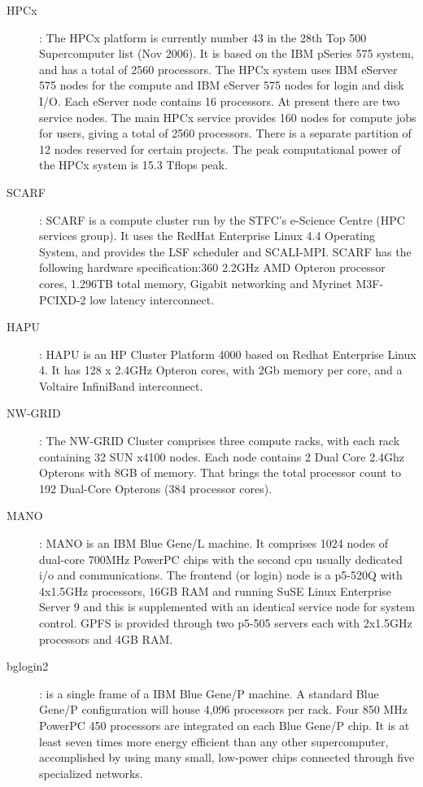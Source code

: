 \begin{description}
\item[HPCx]: The HPCx platform is currently number 43 in the 28th Top 500 Supercomputer list (Nov 2006). It is based on the IBM pSeries 575 system, and has a total of 2560 processors. The HPCx system uses IBM eServer 575 nodes for the compute and IBM eServer 575 nodes for login and disk I/O. Each eServer node contains 16 processors. At present there are two service nodes. The main HPCx service provides 160 nodes for compute jobs for users, giving a total of 2560 processors. There is a separate partition of 12 nodes reserved for certain projects. The peak computational power of the HPCx system is 15.3 Tflops peak.
\item[SCARF]: SCARF is a compute cluster run by the STFC's e-Science Centre (HPC services group). It uses the RedHat Enterprise Linux 4.4 Operating System, and provides the LSF scheduler and SCALI-MPI. SCARF has the following hardware specification:360 2.2GHz AMD Opteron processor cores, 1.296TB total memory, Gigabit networking and Myrinet M3F-PCIXD-2 low latency interconnect.
\item[HAPU]: HAPU is an HP Cluster Platform 4000 based on Redhat Enterprise Linux 4. It has 128 x 2.4GHz Opteron cores, with 2Gb memory per core, and a Voltaire InfiniBand interconnect.
\item[NW-GRID]: The NW-GRID Cluster comprises three compute racks, with each rack containing 32 SUN x4100 nodes. Each node contains 2 Dual Core 2.4Ghz Opterons with 8GB of memory. That brings the total processor count to 192 Dual-Core Opterons (384 processor cores). 
\item[MANO]: MANO is an IBM Blue Gene/L machine. It comprises 1024 nodes of dual-core 700MHz PowerPC chips with the second cpu usually dedicated i/o and communications. The frontend (or login) node is a p5-520Q with 4x1.5GHz processors, 16GB RAM and running SuSE Linux Enterprise Server 9 and this is supplemented with an identical service node for system control. GPFS is provided through two p5-505 servers each with 2x1.5GHz processors and 4GB RAM.
\item[bglogin2]: is a single frame of a IBM Blue Gene/P machine. A standard Blue Gene/P configuration will house 4,096 processors per rack. Four 850 MHz PowerPC 450 processors are integrated on each Blue Gene/P chip. It is at least seven times more energy efficient than any other supercomputer, accomplished by using many small, low-power chips connected through five specialized networks.

\end{description}
